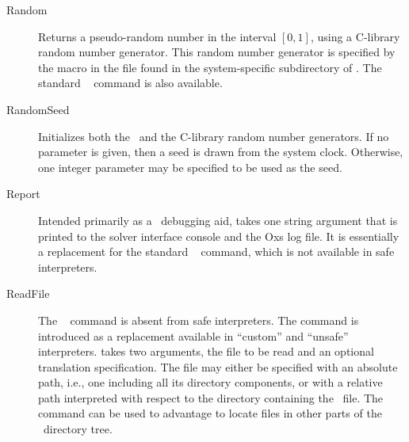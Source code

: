 \begin{description}
\item[Random\label{html:mif2Random}]
Returns a pseudo-random number in the interval $[0,1]$, using a
C-library random number generator.  This random number generator is
specified by the  macro in the  file found in
the system-specific subdirectory of .  The standard
\Tcl\  command is also available.

\item[RandomSeed\label{html:mif2randomseed}]
Initializes both the \Tcl\ and the C-library random number generators.
If no parameter is given, then a seed is drawn from the system clock.
Otherwise, one integer parameter may be specified to be used as the
seed.

\item[Report\label{html:MifReport}]
Intended primarily as a \MIF\ debugging aid,  takes one
string argument that is printed to the solver interface console and the
Oxs log file.  It is essentially a replacement for the standard \Tcl\
 command, which is not available in safe interpreters.

\item[ReadFile\label{html:ReadFile}]
The \Tcl\  command is absent from safe interpreters.  The
 command is introduced as a replacement available in
``custom'' and ``unsafe'' interpreters.  \cd{ReadFile} takes two
arguments, the file to be read and an optional translation
specification.  The file may either be specified with an absolute path,
i.e., one including all its directory components, or with a relative
path interpreted with respect to the directory containing the \MIF\
file.  The  command can be used to advantage to locate
files in other parts of the \OOMMF\ directory tree.


\end{description}
